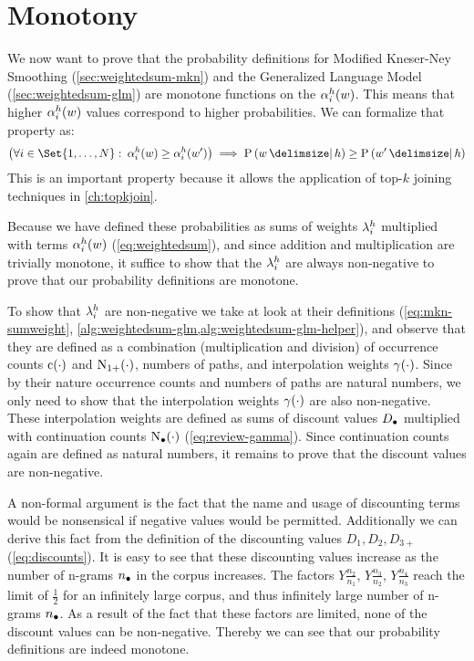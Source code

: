 
\section{Monotony}
\label{sec:monotony}

We now want to prove that the probability definitions for Modified Kneser-Ney
Smoothing (\cref{sec:weightedsum-mkn}) and the Generalized Language Model
(\cref{sec:weightedsum-glm}) are monotone functions on the $\alpha^h_i(w)$.
This means that higher $\alpha^h_i(w)$ values correspond to higher
probabilities.
We can formalize that property as:
\begin{equation}
  \big(\forall i \in \Set{1, \ldots, N}: \: \SumArg^h_i(w) \geq \SumArg^h_i(w^\prime)\big)
    \implies \Prob{w}{h} \geq \Prob{w^\prime}{h}
\end{equation}
This is an important property because it allows the application of top-$k$
joining techniques in \cref{ch:topkjoin}.

Because we have defined these probabilities as sums of weights $\lambda^h_i$
multiplied with terms $\alpha^h_i(w)$ (\cref{eq:weightedsum}), and since
addition and multiplication are trivially monotone, it suffice to show that the
$\lambda^h_i$ are always non-negative to prove that our probability
definitions are monotone.

To show that $\lambda^h_i$ are non-negative we take at look at their
definitions (\cref{eq:mkn-sumweight},
\cref{alg:weightedsum-glm,alg:weightedsum-glm-helper}),
and observe that they are defined as a combination (multiplication and
division) of occurrence counts $\operatorname{c}(\cdot)$ and
$\operatorname{N}_{1+}(\cdot)$, numbers of paths, and interpolation weights
$\gamma(\cdot)$.
Since by their nature occurrence counts and numbers of paths are natural
numbers, we only need to show that the interpolation weights
$\gamma(\cdot)$ are also non-negative.
These interpolation weights are defined as sums of discount values
$D_\bullet$ multiplied with continuation counts
$\operatorname{N}_\bullet(\cdot)$ (\cref{eq:review-gamma}).
Since continuation counts again are defined as natural numbers, it remains to
prove that the discount values are non-negative.

A non-formal argument is the fact that the name and usage of discounting terms
would be nonsensical if negative values would be permitted.
Additionally we can derive this fact from the definition of the discounting
values $D_1, D_2, D_{3+}$ (\cref{eq:discounts}).
It is easy to see that these discounting values increase as the number of
n-grams $n_\bullet$ in the corpus increases.
The factors $Y \frac{n_2}{n_1}$, $Y \frac{n_3}{n_2}$, $Y \frac{n_4}{n_3}$ reach
the limit of $\frac{1}{2}$ for an infinitely large corpus, and thus infinitely
large number of n-grams $n_\bullet$.
As a result of the fact that these factors are limited, none of the discount
values can be non-negative.
Thereby we can see that our probability definitions are indeed monotone.
